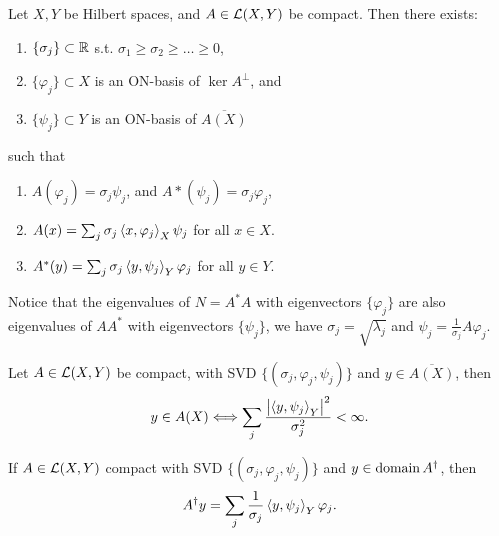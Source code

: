 \documentclass[12pt]{article}
\begin{document}
\begin{theorem}
    Let $X,Y$ be Hilbert spaces, and $A\in \mathcal{L}(X,Y)$ be compact. Then there exists:
    \begin{enumerate}[label=(\alph*)]
        \item $\{\sigma_j\} \subset \mathbb{R}$ s.t. $\sigma_1\geq \sigma_2\geq\dots\geq 0$,
        \item $\{\varphi_j\}\subset X$ is an ON-basis of $\ker A^\perp$, and
        \item $\{\psi_j\}\subset Y$ is an ON-basis of $\overline{A(X)}$
    \end{enumerate}
    such that 
    \begin{enumerate}[label=(\roman*)]
        \item $A(\varphi_j) = \sigma_j \psi_j$, and $A*(\psi_j) = \sigma_j \varphi_j$,
        \item $A(x) = \sum_j \sigma_j \left\langle x, \varphi_j\right\rangle_X \psi_j$ for all $x\in X$.
        \item $A^*(y) = \sum_j \sigma_j \left\langle y, \psi_j\right\rangle_Y \varphi_j$ for all $y\in Y$.
    \end{enumerate}
\end{theorem}


Notice that the eigenvalues of $N=A^*A$ with eigenvectors $\{\varphi_j\}$ are also eigenvalues of $AA^*$ with eigenvectors $\{ \psi_j\}$, we have $\sigma_j = \sqrt{\lambda_j}$ and $\psi_j = \frac{1}{\sigma_j}A\varphi_j$.

\begin{theorem}
    Let $A\in \mathcal{L}(X,Y)$ be compact, with SVD $\{(\sigma_j,\varphi_j, \psi_j)\}$ and $y\in \overline{A(X)}$, then
    \begin{equation*}
        y\in A(X) \Longleftrightarrow \sum_j \frac{\left|\left\langle y, \psi_j\right\rangle_Y\right|^2}{\sigma_j^2}<\infty.
    \end{equation*}
\end{theorem}

\begin{theorem}
    If $A\in \mathcal{L}(X,Y)$ compact with SVD $\{(\sigma_j,\varphi_j, \psi_j)\}$  and $y\in\operatorname{domain} A^\dagger $, then
    \begin{equation*}
        A^\dagger y = \sum_j \frac{1}{\sigma_j}\left\langle y, \psi_j\right\rangle_Y\varphi_j.
    \end{equation*}
\end{theorem}
\end{document}
